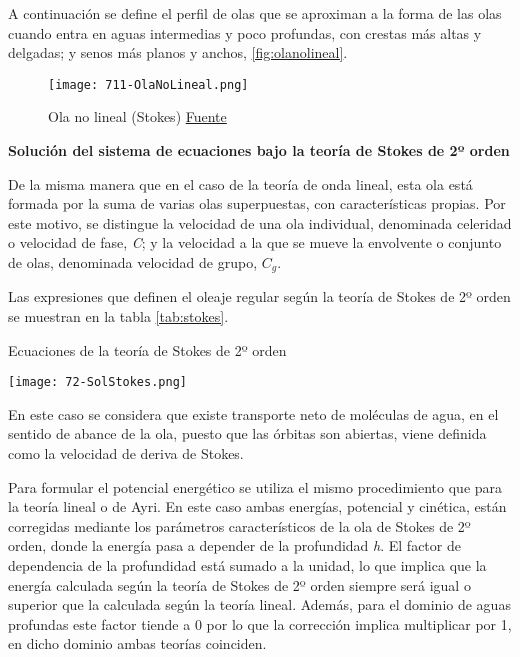 A continuación se define el perfil de olas que se aproximan a la forma
de las olas cuando entra en aguas intermedias y poco profundas, con
crestas más altas y delgadas; y senos más planos y anchos, \autoref{fig:olanolineal}.

\begin{figure}
\centering
\texttt{[image: 711-OlaNoLineal.png]}
\caption[Ola no lineal (Stokes)]{Ola no lineal (Stokes) \href{http://files.pfernandezdiez.es/EnergiasAlternativas/mar/PDFs/01Olas.pdf}{Fuente}}
\label{fig:olanolineal}
\end{figure}

\textbf{Solución del sistema de ecuaciones bajo la teoría de
Stokes de 2º orden}

De la misma manera que en el caso de la teoría de onda lineal, esta ola
está formada por la suma de varias olas superpuestas, con
características propias. Por este motivo, se distingue la velocidad de
una ola individual, denominada celeridad o velocidad de fase, \emph{C};
y la velocidad a la que se mueve la envolvente o conjunto de olas,
denominada velocidad de grupo, \(C_g\).

Las expresiones que definen el oleaje regular según la teoría de Stokes
de 2º orden se muestran en la tabla \autoref{tab:stokes}.

\begin{table}
\centering
\caption{Ecuaciones de la teoría de Stokes de 2º orden}
\texttt{[image: 72-SolStokes.png]}
\label{tab:stokes}
\end{table}


En este caso se considera que existe transporte neto de moléculas de
agua, en el sentido de abance de la ola, puesto que las órbitas son
abiertas, viene definida como la velocidad de deriva de Stokes.

Para formular el potencial energético se utiliza el mismo procedimiento
que para la teoría lineal o de Ayri. En este caso ambas energías,
potencial y cinética, están corregidas mediante los parámetros
característicos de la ola de Stokes de 2º orden, donde la energía pasa a
depender de la profundidad \emph{h}. El factor de dependencia de la
profundidad está sumado a la unidad, lo que implica que la energía
calculada según la teoría de Stokes de 2º orden siempre será igual o
superior que la calculada según la teoría lineal. Además, para el
dominio de aguas profundas este factor tiende a 0 por lo que la
corrección implica multiplicar por 1, en dicho dominio ambas teorías
coinciden.

